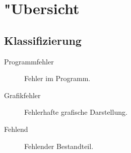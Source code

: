 %



\section{{"U}bersicht}
\label{Kapitel:Programmfehler:Uebersicht}








\subsection{Klassifizierung}
\label{Abschnitt:Programmfehler:Uebersicht:Klassifizierung}



\begin{description}

	\item[Programmfehler] Fehler im Programm.
	
	\item[Grafikfehler] Fehlerhafte grafische Darstellung.
	
	\item[Fehlend] Fehlender Bestandteil.

\end{description}





